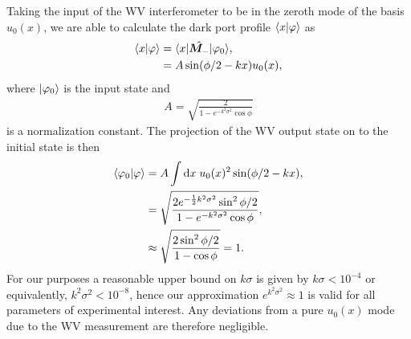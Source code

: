Taking the input of the WV interferometer to be in the zeroth mode of the basis $u_0(x)$, we are able to calculate the dark port profile $\langle x \vert \varphi \rangle$ as 
\begin{align}
\nonumber \langle x \vert \varphi \rangle &= \langle x \rvert\hat{\bm M_-}\lvert \varphi_0\rangle,\\
&= A\sin(\phi/2 - k x)u_0(x),
\end{align}
where $\lvert \varphi_0\rangle$ is the input state and
\begin{align} 
A = \sqrt{\frac{2}{1-e^{-k^2\sigma^2}\cos \phi}}
\end{align}
is a normalization constant.  The projection of the WV output state on to the initial state is then 
\begin{align}
\nonumber \langle \varphi_0 \vert \varphi \rangle &= A\int \text{d}x\; u_0(x)^2 \sin(\phi/2 - k x), \\
\nonumber &= \sqrt{\frac{2e^{-\frac{1}{2}k^2\sigma^2}\sin^2 \phi/2}{1 - e^{-k^2\sigma^2}\cos\phi}}, \\
&\approx \sqrt{\frac{2\sin^2 \phi/2}{1 - \cos\phi}} = 1.
\end{align}
For our purposes a reasonable upper bound on $k\sigma$ is given by $k\sigma < 10^{-4}$ or equivalently, $k^2\sigma^2 < 10^{-8}$, hence our approximation $e^{k^2\sigma^2} \approx 1$ is valid for all parameters of experimental interest.  Any deviations from a pure $u_0(x)$ mode due to the WV measurement are therefore negligible. 


